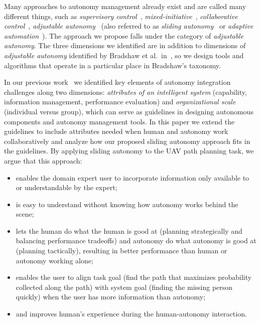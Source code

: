 \documentclass[lettersize, apacite, twoside, HRI]{apa_HRI}
\begin{document}
Many approaches to autonomy management already exist and are called many different things, such as \textit{supervisory control}~\cite{Sheridan1992Telerobotics}, \textit{mixed-initiative}~\cite{Hearst1999Mixed}, \textit{collaborative control}~\cite{Fong1999Collaborative}, \textit{adjustable autonomy}~\cite{Dorais1998AdjustableAutonomy,Dorais2001Designing} (also referred to as \textit{sliding autonomy}~\cite{Dias2008SlidingAutonomy} or \textit{adaptive automation}~\cite{Rouse1988Adaptive,Kaber2001Design}). The approach we propose falls under the category of \textit{adjustable autonomy}. The three dimensions we identified are in addition to dimensions of \textit{adjustable autonomy} identified by Bradshaw et al.\ in~\cite{Bradshaw2004Dimensions}, so we design tools and algorithms that operate in a particular place in Bradshaw's taxonomy.

In our previous work~\cite{Lin2010Supporting} we identified key elements of autonomy integration challenges along two dimensions: \textit{attributes of an intelligent system} (capability, information management, performance evaluation) and \textit{organizational scale} (individual versus group), which can serve as guidelines in designing autonomous components and autonomy management tools. In this paper we extend the guidelines to include attributes needed when human and autonomy work collaboratively and analyze how our proposed sliding autonomy approach fits in the guidelines. By applying sliding autonomy to the UAV path planning task, we argue that this approach:
\begin{itemize}
\item enables the domain expert user to incorporate information only available to or understandable by the expert;
\item is easy to understand without knowing how autonomy works behind the scene;
\item lets the human do what the human is good at (planning strategically and balancing performance tradeoffs) and autonomy do what autonomy is good at (planning tactically), resulting in better performance than human or autonomy working alone;
\item enables the user to align task goal (find the path that maximizes probability collected along the path) with system goal (finding the missing person quickly) when the user has more information than autonomy;
\item and improves human's experience during the human-autonomy interaction.
\end{itemize}
\end{document}

